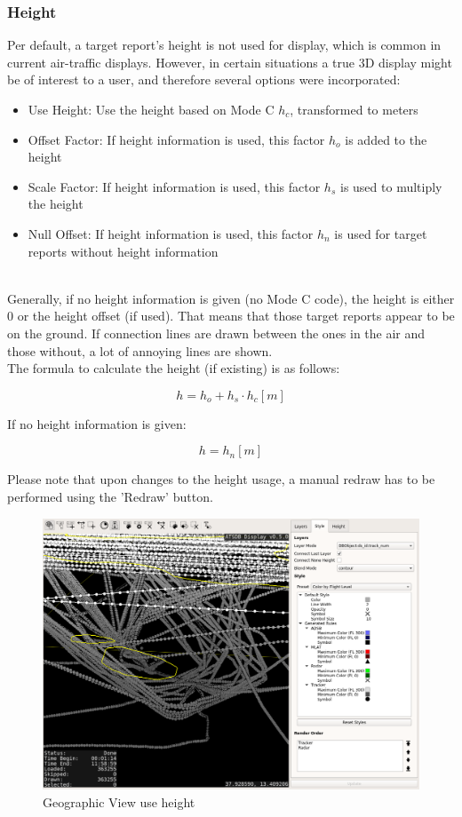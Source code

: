 \subsubsection{Height}
\label{sec:others_height}

Per default, a target report's height is not used for display, which is common in current air-traffic displays. However, in certain situations a true 3D display might be of interest to a user, and therefore several options were incorporated:

\begin{itemize}
 \item Use Height: Use the height based on Mode C $h_c$, transformed to meters
 \item Offset Factor: If height information is used, this factor $h_o$ is added to the height
 \item Scale Factor: If height information is used, this factor $h_s$ is used to multiply the height
 \item Null Offset: If height information is used, this factor $h_n$ is used for target reports without height information
\end{itemize}
\ \\

Generally, if no height information is given (no Mode C code), the height is either $0$ or the height offset (if used). That means that those target reports appear to be on the ground. If connection lines are drawn between the ones in the air and those without, a lot of annoying lines are shown. \\

The formula to calculate the height (if existing) is as follows: 

$$ h = h_o + h_s \cdot h_c [m]$$ 

If no height information is given:

$$ h = h_n [m]$$ 

Please note that upon changes to the height usage, a manual redraw has to be performed using the 'Redraw' button.


\begin{figure}[H]
    \hspace*{-2.5cm}
    \includegraphics[width=19cm,frame]{figures/geoview_use_height.png}
  \caption{Geographic View use height}
\end{figure} 

